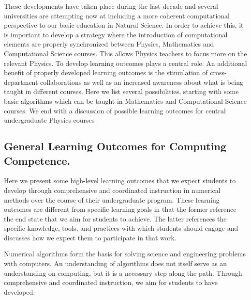 \documentclass[graybox,envcountchap,sectrefs]{svmult}
\begin{document}
These developments have taken place during the last decade and several
universities are attempting now at including a more coherent
computational perspective to our basic education in Natural
Science. In order to achieve this, it is important to develop a
strategy where the introduction of computational elements are properly
synchronized between Physics, Mathematics and Computational Science
courses. This allows Physics teachers to focus more on the relevant
Physics. To develop learning outcomes plays a central role.  An
additional benefit of properly developed learning outcomes is the
stimulation of cross-department collaborations as well as an increased
awareness about what is being taught in different courses.  Here we
list several possibilities, starting with some basic algorithms which
can be taught in Mathematics and Computational Science courses. We end
with a discussion of possible learning outcomes for central
undergraduate Physics courses




\subsection{General Learning Outcomes for Computing Competence.}

Here we present some high-level learning outcomes that we expect
students to develop through comprehensive and coordinated instruction
in numerical methods over the course of their undergraduate
program. These learning outcomes are different from specific learning
goals in that the former reference the end state that we aim for
students to achieve. The latter references the specific knowledge,
tools, and practices with which students should engage and discusses
how we expect them to participate in that work.

Numerical algorithms form the basis for solving science and
engineering problems with computers. An understanding of algorithms
does not itself serve as an understanding on computing, but it is a
necessary step along the path. Through comprehensive and coordinated
instruction, we aim for students to have developed:
\end{document}
